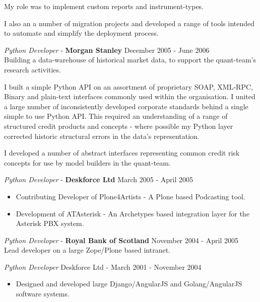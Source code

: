 \documentclass[margin, 10pt]{res} %
\begin{document}
\begin{resume}
        My role was to implement custom reports and instrument-types.

        I also an a number of migration projects and developed a range of tools intended to automate and simplify the deployment process.

        {\sl Python Developer} - \textbf{Morgan Stanley} \hfill December 2005 - June 2006\\


        Building a data-warehouse of historical market data, to support the quant-team's research activities.

        I built a simple Python API on an assortment of proprietary SOAP, XML-RPC, Binary and plain-text interfaces commonly used within the organisation. I united a large number of inconsistently developed corporate standards behind a single simple to use Python API. This required an understanding of a range of structured credit products and concepts - where possible my Python layer corrected historic structural errors in the data's representation.

        I developed a number of abstract interfaces representing common credit risk concepts for use by model builders in the quant-team.

        {\sl Python Developer} - \textbf{Deskforce Ltd} \hfill March 2005 - April 2005\\

        \begin{itemize}
            \item Contributing Developer of Plone4Artists - A Plone based Podcasting tool.
            \item Development of ATAsterisk - An Archetypes based integration layer for the Asterisk PBX system.
        \end{itemize}

        {\sl Python Developer} - \textbf{Royal Bank of Scotland} \hfill November 2004 - April 2005\\

        Lead developer on a large Zope/Plone based intranet.

        {\sl Python Developer} \hfill Deskforce Ltd - March 2001 - November 2004\\

        \begin{itemize}
            \item Designed and developed large Django/AngularJS and Golang/AngularJS software systems.
        \end{itemize}


\end{resume}
\end{document}
